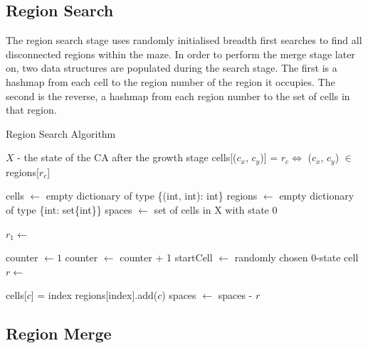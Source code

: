 \subsection{Region Search}

The region search stage uses randomly initialised breadth first searches to find all disconnected regions within the maze. In order to perform the merge stage later on, two data structures are populated during the search stage. The first is a hashmap from each cell to the region number of the region it occupies. The second is the reverse, a hashmap from each region number to the set of cells in that region.

\begin{algorithm}
  \caption{Region Search Algorithm}\label{alg:region-find}
  \begin{algorithmic}
  \Require $X$ - the state of the CA after the growth stage
  \Ensure cells[($c_x$, $c_y$)] = $r_c \iff$ ($c_x$, $c_y$) $\in$ regions[$r_c$]

  \State cells $\gets$ empty dictionary of type \{(int, int): int\}
  \State regions $\gets$ empty dictionary of type \{int: set\{int\}\}
  \State spaces $\gets$ set of cells in X with state 0

  \State $r_1 \gets$ 
  \State {}
  
  \State counter $\gets 1$
    \State counter $\gets$ counter + 1
    \State startCell $\gets$ randomly chosen 0-state cell
    \State $r \gets$ 
    \State {}
  \EndWhile

        \State cells[$c$] = index
        \State regions[index].add($c$)
    \EndFor
    \State spaces $\gets$ spaces - $r$
  \EndProcedure
  \end{algorithmic}
\end{algorithm}

\subsection{Region Merge}

